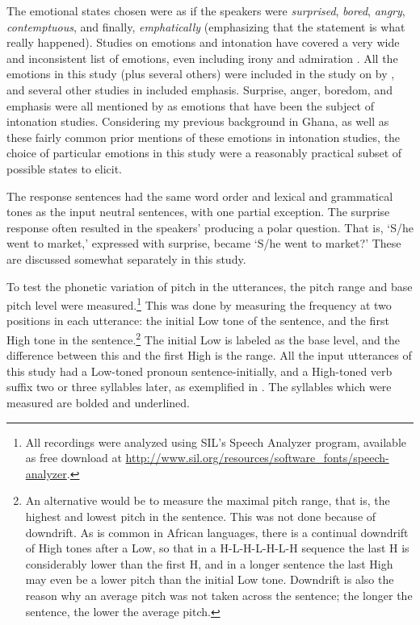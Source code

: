 \documentclass[output=paper]{langsci/langscibook}
\begin{document}
The emotional states chosen were as if the speakers were \emph{surprised}, \emph{bored}, \emph{angry}, \emph{contemptuous}, and finally, \emph{emphatically} (emphasizing that the statement is what really happened). Studies on emotions and intonation have covered a very wide and inconsistent list of emotions, even including irony and admiration \citep[402]{doetal1998}. All the emotions in this study (plus several others) were included in the study on  by \citet{luksaneeyanawin1998}, and several other studies in \citet{hirstdicristo1998} included emphasis. Surprise, anger, boredom, and emphasis were all mentioned by \citet{ladd2008} as emotions that have been the subject of intonation studies. Considering my previous background in Ghana, as well as these fairly common prior mentions of these emotions in intonation studies, the choice of particular emotions in this study were a reasonably practical subset of possible states to elicit.

The response sentences had the same word order and lexical and grammatical tones as the input neutral sentences, with one partial exception. The surprise response often resulted in the speakers' producing a polar question. That is, `S/he went to market,' expressed with surprise, became `S/he went to market?' These are discussed somewhat separately in this study. 

To test the phonetic variation of pitch in the utterances, the pitch range and base pitch level were measured.\footnote{All recordings were analyzed using SIL's Speech Analyzer program, available as free download at \url{http://www.sil.org/resources/software_fonts/speech-analyzer}.} This was done by measuring the frequency at two positions in each utterance: the initial Low tone of the sentence, and the first High tone in the sentence.\footnote{An alternative would be to measure the maximal pitch range, that is, the highest and lowest pitch in the sentence. This was not done because of downdrift. As is common in African languages, there is a continual downdrift of High tones after a Low, so that in a H-L-H-L-H-L-H sequence the last H is considerably lower than the first H, and in a longer sentence the last High may even be a lower pitch than the initial Low tone. Downdrift is also the reason why an average pitch was not taken across the sentence; the longer the sentence, the lower the average pitch.} The initial Low is labeled as the base level, and the difference between this and the first High is the range. All the input utterances of this study had a Low-toned pronoun sentence-initially, and a High-toned verb suffix two or three syllables later, as exemplified in . The syllables which were measured are bolded and underlined.
\end{document}
